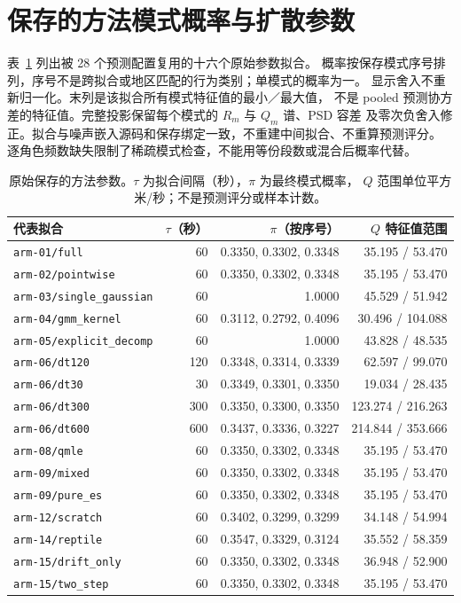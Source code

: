 \section{保存的方法模式概率与扩散参数}
\label{sec:method-noise-parameters}\hypertarget{sec:method-noise-parameters}{}
表~\ref{tab:method-noise-parameters} 列出被 28 个预测配置复用的十六个原始参数拟合。
概率按保存模式序号排列，序号不是跨拟合或地区匹配的行为类别；单模式的概率为一。
显示舍入不重新归一化。末列是该拟合所有模式特征值的最小／最大值，
不是 pooled 预测协方差的特征值。完整投影保留每个模式的 $R_m$ 与 $Q_m$ 谱、PSD 容差
及零次负舍入修正。拟合与噪声嵌入源码和保存绑定一致，不重建中间拟合、不重算预测评分。
逐角色频数缺失限制了稀疏模式检查，不能用等份段数或混合后概率代替。

\begin{table}[htbp]
\centering\footnotesize
\caption{原始保存的方法参数。$\tau$ 为拟合间隔（秒），$\pi$ 为最终模式概率，
$Q$ 范围单位平方米/秒；不是预测评分或样本计数。}
\label{tab:method-noise-parameters}\hypertarget{tab:method-noise-parameters}{}
\begin{tabular}{lrrr}
\toprule
代表拟合 & $\tau$（秒） & $\pi$（按序号） & $Q$ 特征值范围\\
\midrule
\texttt{arm-01/full} & 60 & 0.3350, 0.3302, 0.3348 & 35.195 / 53.470\\
\texttt{arm-02/pointwise} & 60 & 0.3350, 0.3302, 0.3348 & 35.195 / 53.470\\
\texttt{arm-03/single\_gaussian} & 60 & 1.0000 & 45.529 / 51.942\\
\texttt{arm-04/gmm\_kernel} & 60 & 0.3112, 0.2792, 0.4096 & 30.496 / 104.088\\
\texttt{arm-05/explicit\_decomp} & 60 & 1.0000 & 43.828 / 48.535\\
\texttt{arm-06/dt120} & 120 & 0.3348, 0.3314, 0.3339 & 62.597 / 99.070\\
\texttt{arm-06/dt30} & 30 & 0.3349, 0.3301, 0.3350 & 19.034 / 28.435\\
\texttt{arm-06/dt300} & 300 & 0.3350, 0.3300, 0.3350 & 123.274 / 216.263\\
\texttt{arm-06/dt600} & 600 & 0.3437, 0.3336, 0.3227 & 214.844 / 353.666\\
\texttt{arm-08/qmle} & 60 & 0.3350, 0.3302, 0.3348 & 35.195 / 53.470\\
\texttt{arm-09/mixed} & 60 & 0.3350, 0.3302, 0.3348 & 35.195 / 53.470\\
\texttt{arm-09/pure\_es} & 60 & 0.3350, 0.3302, 0.3348 & 35.195 / 53.470\\
\texttt{arm-12/scratch} & 60 & 0.3402, 0.3299, 0.3299 & 34.148 / 54.994\\
\texttt{arm-14/reptile} & 60 & 0.3547, 0.3329, 0.3124 & 35.552 / 58.359\\
\texttt{arm-15/drift\_only} & 60 & 0.3350, 0.3302, 0.3348 & 36.948 / 52.900\\
\texttt{arm-15/two\_step} & 60 & 0.3350, 0.3302, 0.3348 & 35.195 / 53.470\\
\bottomrule
\end{tabular}
\end{table}



